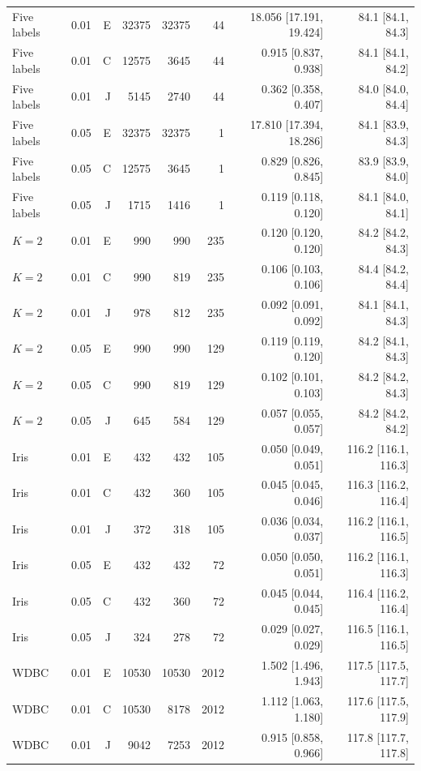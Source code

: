 \begin{table}[t]
\begin{tabular}{lrrrrrrr}
Five labels & 0.01 & E & 32375 & 32375 & 44 & 18.056 [17.191, 19.424] & 84.1 [84.1, 84.3] \\
Five labels & 0.01 & C & 12575 & 3645 & 44 & 0.915 [0.837, 0.938] & 84.1 [84.1, 84.2] \\
Five labels & 0.01 & J & 5145 & 2740 & 44 & 0.362 [0.358, 0.407] & 84.0 [84.0, 84.4] \\
Five labels & 0.05 & E & 32375 & 32375 & 1 & 17.810 [17.394, 18.286] & 84.1 [83.9, 84.3] \\
Five labels & 0.05 & C & 12575 & 3645 & 1 & 0.829 [0.826, 0.845] & 83.9 [83.9, 84.0] \\
Five labels & 0.05 & J & 1715 & 1416 & 1 & 0.119 [0.118, 0.120] & 84.1 [84.0, 84.1] \\
$K=2$ & 0.01 & E & 990 & 990 & 235 & 0.120 [0.120, 0.120] & 84.2 [84.2, 84.3] \\
$K=2$ & 0.01 & C & 990 & 819 & 235 & 0.106 [0.103, 0.106] & 84.4 [84.2, 84.4] \\
$K=2$ & 0.01 & J & 978 & 812 & 235 & 0.092 [0.091, 0.092] & 84.1 [84.1, 84.3] \\
$K=2$ & 0.05 & E & 990 & 990 & 129 & 0.119 [0.119, 0.120] & 84.2 [84.1, 84.3] \\
$K=2$ & 0.05 & C & 990 & 819 & 129 & 0.102 [0.101, 0.103] & 84.2 [84.2, 84.3] \\
$K=2$ & 0.05 & J & 645 & 584 & 129 & 0.057 [0.055, 0.057] & 84.2 [84.2, 84.2] \\
Iris & 0.01 & E & 432 & 432 & 105 & 0.050 [0.049, 0.051] & 116.2 [116.1, 116.3] \\
Iris & 0.01 & C & 432 & 360 & 105 & 0.045 [0.045, 0.046] & 116.3 [116.2, 116.4] \\
Iris & 0.01 & J & 372 & 318 & 105 & 0.036 [0.034, 0.037] & 116.2 [116.1, 116.5] \\
Iris & 0.05 & E & 432 & 432 & 72 & 0.050 [0.050, 0.051] & 116.2 [116.1, 116.3] \\
Iris & 0.05 & C & 432 & 360 & 72 & 0.045 [0.044, 0.045] & 116.4 [116.2, 116.4] \\
Iris & 0.05 & J & 324 & 278 & 72 & 0.029 [0.027, 0.029] & 116.5 [116.1, 116.5] \\
WDBC & 0.01 & E & 10530 & 10530 & 2012 & 1.502 [1.496, 1.943] & 117.5 [117.5, 117.7] \\
WDBC & 0.01 & C & 10530 & 8178 & 2012 & 1.112 [1.063, 1.180] & 117.6 [117.5, 117.9] \\
WDBC & 0.01 & J & 9042 & 7253 & 2012 & 0.915 [0.858, 0.966] & 117.8 [117.7, 117.8] \\

\end{tabular}
\end{table}
